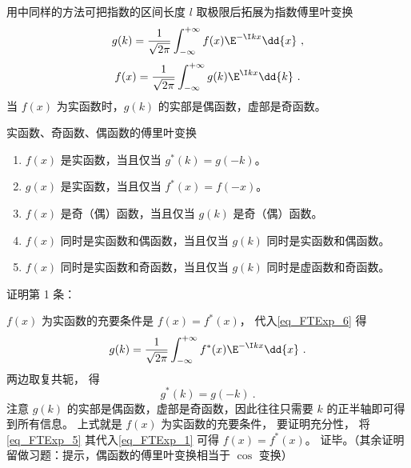 

用中同样的方法可把指数的区间长度 $l$ 取极限后拓展为指数傅里叶变换
\begin{equation}\label{eq_FTExp_6}
g(k) = \frac{1}{\sqrt{2\pi }} \int_{-\infty }^{+\infty } f(x)\E^{-\I kx} \dd{x}~,
\end{equation}
\begin{equation}\label{eq_FTExp_1}
f(x) = \frac{1}{\sqrt{2\pi }} \int_{-\infty }^{+\infty } g(k)\E^{\I kx} \dd{k}~.
\end{equation}
当 $f(x)$ 为实函数时，$g(k)$ 的实部是偶函数，虚部是奇函数。

\begin{theorem}{实函数、奇函数、偶函数的傅里叶变换}\label{the_FTExp_1}
\begin{enumerate}
\item $f(x)$ 是实函数，当且仅当 $g^*(k) = g(-k)$。
\item $g(x)$ 是实函数，当且仅当 $f^*(x) = f(-x)$。
\item $f(x)$ 是奇（偶）函数，当且仅当 $g(k)$ 是奇（偶）函数。
\item $f(x)$ 同时是实函数和偶函数，当且仅当 $g(k)$ 同时是实函数和偶函数。
\item $f(x)$ 同时是实函数和奇函数，当且仅当 $g(k)$ 同时是虚函数和奇函数。
\end{enumerate}
\end{theorem}
证明第 1 条：

$f(x)$ 为实函数的充要条件是 $f(x) = f^*(x)$， 代入\autoref{eq_FTExp_6} 得
\begin{equation}
g(k) = \frac{1}{\sqrt{2\pi }} \int_{-\infty }^{+\infty } f^*(x)\E^{-\I kx} \dd{x}~.
\end{equation}
两边取复共轭， 得
\begin{equation}\label{eq_FTExp_5}
g^*(k) = g(-k)~.
\end{equation}
注意 $g(k)$ 的实部是偶函数，虚部是奇函数，因此往往只需要 $k$ 的正半轴即可得到所有信息。 上式就是 $f(x)$ 为实函数的充要条件， 要证明充分性， 将\autoref{eq_FTExp_5} 其代入\autoref{eq_FTExp_1} 可得 $f(x) = f^*(x)$。 证毕。（其余证明留做习题：提示，偶函数的傅里叶变换相当于 $\cos$ 变换）

